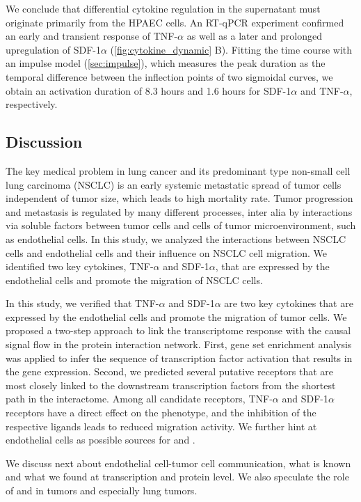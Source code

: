 We conclude that differential cytokine regulation in the supernatant 
must originate primarily from the HPAEC cells.  
An RT-qPCR experiment confirmed an early and transient response of  
TNF-$\alpha$ as well as a later and prolonged upregulation of 
SDF-1$\alpha$ (\ref{fig:cytokine_dynamic} B). 
Fitting the time course with an impulse model 
(\ref{sec:impulse}), which measures the peak 
duration as the 
temporal difference between the inflection points of two
sigmoidal curves, 
we obtain an activation duration of  8.3 hours and 1.6 hours for SDF-1$\alpha$
and TNF-$\alpha$, respectively.

\subsection{Discussion}

The key medical problem in lung cancer and its predominant type non-small 
cell lung carcinoma (NSCLC) is an early systemic metastatic spread of tumor cells 
independent of tumor size, which leads to high mortality rate. Tumor progression 
and metastasis is regulated by many different processes, inter alia by interactions 
via soluble factors between tumor cells and cells of tumor microenvironment, such as 
endothelial cells. In this study, we analyzed the interactions between NSCLC cells 
and endothelial cells and their influence on NSCLC cell migration. We identified 
two key cytokines, TNF-$\alpha$ and SDF-1$\alpha$, that are expressed by the 
endothelial cells and promote the migration of NSCLC cells.

In this study, we verified that TNF-$\alpha$ and SDF-1$\alpha$ are two
key cytokines that are expressed by the endothelial cells and promote the migration
of tumor cells. We proposed a two-step approach to link the transcriptome response
with the causal signal flow in the protein interaction network. First, gene set
enrichment analysis was applied to infer the sequence of transcription factor
activation that results in the gene expression. Second, we predicted several
putative receptors that are most closely linked to the downstream transcription
factors from the 
shortest path in the interactome. Among all candidate receptors,
TNF-$\alpha$ and SDF-1$\alpha$ receptors have a direct effect on the phenotype,
and the inhibition of the respective ligands leads to reduced migration 
activity. We further
hint at endothelial cells as possible sources for \tnfa and \sdfonea.

We discuss next about endothelial cell-tumor cell communication, what is known and what we found at transcription and protein level.
We also speculate the role of \tnfa and \sdfonea in tumors and especially lung tumors.

